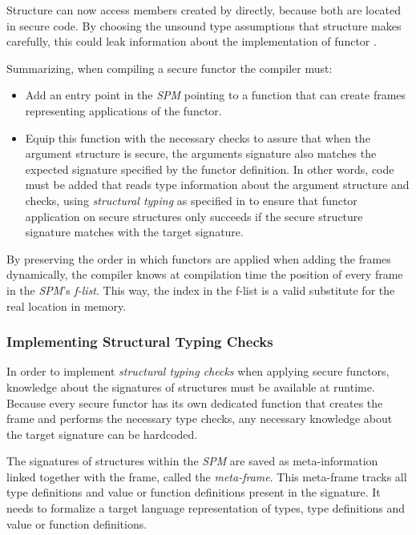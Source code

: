 \begin{description}
Structure  can now access members created by  directly, because both are located in secure code.
By choosing the unsound type assumptions that structure  makes carefully, this could leak information about the implementation of functor .

Summarizing, when compiling a secure functor the compiler must: %
\begin{itemize}
\item Add an entry point in the \emph{SPM} pointing to a function that can create frames representing applications of the functor.
\item Equip this function with the necessary checks to assure that when the argument structure is secure, the arguments signature also matches the expected signature specified by the functor definition.
In other words, code must be added that reads type information about the argument structure and checks, using \emph{structural typing} as specified in  to ensure that functor application on secure structures only succeeds if the secure structure signature matches with the target signature.
\end{itemize}

By preserving the order in which functors are applied when adding the frames dynamically, the compiler knows at compilation time the position of every frame in the \emph{SPM}'s \emph{f-list}.
This way, the index in the f-list is a valid substitute for the real location  in memory.
\end{description}

\subsubsection{Implementing Structural Typing Checks}
In order to implement \emph{structural typing checks} when applying secure functors, knowledge about the signatures of structures must be available at runtime.
Because every secure functor has its own dedicated function that creates the frame and performs the necessary type checks, any necessary knowledge about the target signature can be hardcoded.

The signatures of structures within the \emph{SPM} are saved as meta-information linked together with the frame, called the \emph{meta-frame}.
This meta-frame tracks all type definitions and value or function definitions present in the signature.
It needs to formalize a target language representation of types, type definitions and value or function definitions.


